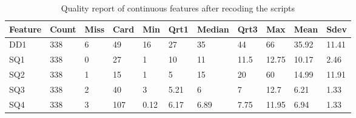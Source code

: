 \documentclass[]{book}
\begin{document}
\begin{table}[ht]
\centering
\caption{Quality report of continuous features after recoding the scripts}
\label{tab-quality-report-continuous-after-recoding-scripts}
\begin{tabular}{lllllllllll}
\hline
\multicolumn{1}{c}{\textbf{Feature}} & \multicolumn{1}{c}{\textbf{Count}} & \multicolumn{1}{c}{\textbf{Miss}} & \multicolumn{1}{c}{\textbf{Card}} & \multicolumn{1}{c}{\textbf{Min}} & \multicolumn{1}{c}{\textbf{Qrt1}} & \multicolumn{1}{c}{\textbf{Median}} & \multicolumn{1}{c}{\textbf{Qrt3}} & \multicolumn{1}{c}{\textbf{Max}} & \multicolumn{1}{c}{\textbf{Mean}} & \multicolumn{1}{c}{\textbf{Sdev}} \\ 
\hline
DD1   & 338  & 6  & 49  & 16  & 27    & 35  & 44    & 66    & 35.92    & 11.41     \\
SQ1   & 338  & 0  & 27  & 1   & 10    & 11  & 11.5  & 12.75 & 10.17    & 2.46      \\
SQ2   & 338  & 1  & 15  & 1   & 5     & 15  & 20    & 60    & 14.99    & 11.91     \\
SQ3   & 338  & 2  & 40  & 3   & 5.21  & 6   & 7     & 12.7  & 6.21     & 1.33      \\
SQ4   & 338  & 3  & 107 & 0.12& 6.17  & 6.89& 7.75  & 11.95 & 6.94     & 1.33      \\ 
\hline
\end{tabular}
\end{table}
\end{document}

